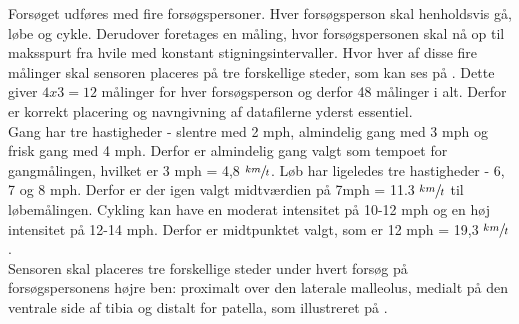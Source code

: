 Forsøget udføres med fire forsøgspersoner. Hver forsøgsperson skal henholdsvis gå, løbe og cykle. Derudover foretages en måling, hvor forsøgspersonen skal nå op til maksspurt fra hvile med konstant stigningsintervaller. Hvor hver af disse fire målinger skal sensoren placeres på tre forskellige steder, som kan ses på . Dette giver $4 x 3 = 12$ målinger for hver forsøgsperson og derfor 48 målinger i alt. Derfor er korrekt placering og navngivning af datafilerne yderst essentiel. \\ 
Gang har tre hastigheder - slentre med 2 mph, almindelig gang med 3 mph og frisk gang med 4 mph. Derfor er almindelig gang valgt som tempoet for gangmålingen, hvilket er 3 mph = 4,8 $\sfrac{km}{t}$. Løb har ligeledes tre hastigheder - 6, 7 og 8 mph. Derfor er der igen valgt midtværdien på 7mph = 11.3 $\sfrac{km}{t}$ til løbemålingen. Cykling kan have en moderat intensitet på 10-12 mph og en høj intensitet på 12-14 mph. Derfor er midtpunktet valgt, som er 12 mph = 19,3 $\sfrac{km}{t}$.\citep{Miles2007} \\
Sensoren skal placeres tre forskellige steder under hvert forsøg på forsøgspersonens højre ben: proximalt over den laterale malleolus, medialt på den ventrale side af tibia og distalt for patella, som illustreret på .
